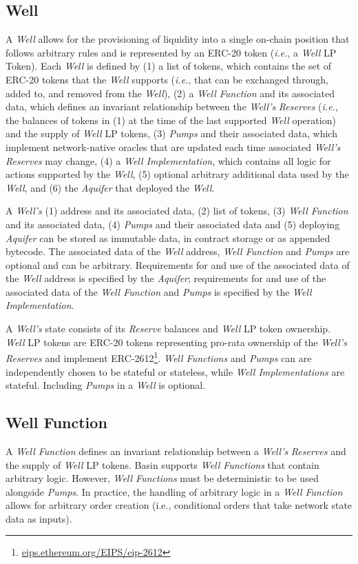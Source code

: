 \documentclass[tikz]{article}
\newcommand{\term}[1]{\textsl{#1}}
\newcommand{\fref}[1]{\footnote{\href{http://#1}{#1}}}
\begin{document}
\subsection{Well}
A \term{Well} allows for the provisioning of liquidity into a single on-chain position that follows arbitrary rules and is represented by an ERC-20 token (\textit{i.e.}, a \term{Well} LP Token). Each \term{Well} is defined by (1) a list of tokens, which contains the set of ERC-20 tokens that the \term{Well} supports (\textit{i.e.}, that can be exchanged through, added to, and removed from the \term{Well}), (2) a \term{Well Function} and its associated data, which defines an invariant relationship between the \term{Well's} \term{Reserves} (\textit{i.e.}, the balances of tokens in (1) at the time of the last supported \term{Well} operation) and the supply of \term{Well} LP tokens, (3) \term{Pumps} and their associated data, which implement network-native oracles that are updated each time associated \term{Well's} \term{Reserves} may change, (4) a \term{Well Implementation}, which contains all logic for actions supported by the \term{Well}, (5) optional arbitrary additional data used by the \term{Well}, and (6) the \term{Aquifer} that deployed the \term{Well}.

\newpage
A \term{Well's} (1) address and its associated data, (2) list of tokens, (3) \term{Well Function} and its associated data, (4) \term{Pumps} and their associated data and (5) deploying \term{Aquifer} can be stored as immutable data, in contract storage or as appended bytecode. The associated data of the \term{Well} address, \term{Well Function} and \term{Pumps} are optional and can be arbitrary. Requirements for and use of the associated data of the \term{Well} address is specified by the \term{Aquifer}; requirements for and use of the associated data of the \term{Well Function} and \term{Pumps} is specified by the \term{Well Implementation}. 

A \term{Well's} state consists of its \term{Reserve} balances and \term{Well} LP token ownership.  \term{Well} LP tokens are ERC-20 tokens representing pro-rata ownership of the \term{Well’s} \term{Reserves} and implement ERC-2612\fref{eips.ethereum.org/EIPS/eip-2612}. \term{Well Functions} and \term{Pumps} can are independently chosen to be stateful or stateless, while \term{Well Implementations} are stateful. Including \term{Pumps} in a \term{Well} is optional.

\subsection{Well Function}
A \term{Well Function} defines an invariant relationship between a \term{Well's} \term{Reserves} and the supply of \term{Well} LP tokens. Basin supports \term{Well Functions} that contain arbitrary logic. However, \term{Well Functions} must be deterministic to be used alongside \term{Pumps}. In practice, the handling of arbitrary logic in a \term{Well Function} allows for arbitrary order creation (i.e., conditional orders that take network state data as inputs).
\end{document}
